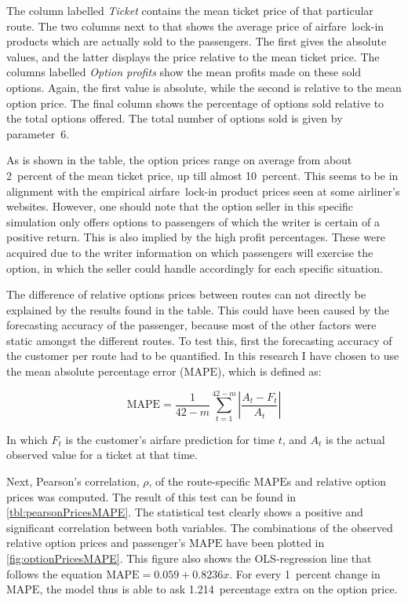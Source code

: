 The column labelled \emph{Ticket} contains the mean ticket price of that particular route. The two columns next to that shows the average price of airfare~lock-in products which are actually sold to the passengers. The first gives the absolute values, and the latter displays the price relative to the mean ticket price. The columns labelled \emph{Option profits} show the mean profits made on these sold options. Again, the first value is absolute, while the second is relative to the mean option price. The final column shows the percentage of options sold relative to the total options offered. The total number of options sold is given by parameter~6.

As is shown in the table, the option prices range on average from about 2~percent of the mean ticket price, up till almost 10~percent. This seems to be in alignment with the empirical airfare~lock-in product prices seen at some airliner's websites. However, one should note that the option seller in this specific simulation only offers options to passengers of which the writer is certain of a positive return. This is also implied by the high profit percentages. These were acquired due to the writer information on which passengers will exercise the option, in which the seller could handle accordingly for each specific situation.

The difference of relative options prices between routes can not directly be explained by the results found in the table. This could have been caused by the forecasting accuracy of the passenger, because most of the other factors were static amongst the different routes. To test this, first the forecasting accuracy of the customer per route had to be quantified. In this research I have chosen to use the mean absolute percentage error ($\mbox{MAPE}$), which is defined as:

$$\mbox{MAPE} = \frac{1}{42-m}\sum_{t=1}^{42 - m} \left| \frac{A_{t}-F_t}{A_{t}}\right|$$

In which $F_t$ is the customer's airfare prediction for time $t$, and $A_t$ is the actual observed value for a ticket at that time.

Next, Pearson's correlation, $\rho$, of the route-specific $\mbox{MAPE}$s and relative option prices was computed. The result of this test can be found in \autoref{tbl:pearsonPricesMAPE}. The statistical test clearly shows a positive and significant correlation between both variables. The combinations of the observed relative option prices and passenger's $\mbox{MAPE}$ have been plotted in \autoref{fig:optionPricesMAPE}. This figure also shows the OLS-regression line that follows the equation $\mbox{MAPE} = 0.059 + 0.8236x$. For every 1~percent change in $\mbox{MAPE}$, the model thus is able to ask 1.214~percentage extra on the option price.

